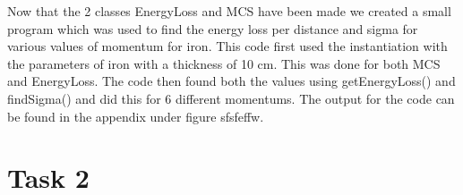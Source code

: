 \documentclass{article}
\begin{document}
Now that the 2 classes EnergyLoss and MCS have been made we created a small program which was used to find the energy loss per distance and sigma for various values of momentum for iron. This code first used the instantiation with the parameters of iron with a thickness of 10 cm. This was done for both MCS and EnergyLoss. The code then found both the values using getEnergyLoss() and findSigma() and did this for 6 different momentums. The output for the code can be found in the appendix under figure sfsfeffw. %














\section{Task 2}
\end{document}
